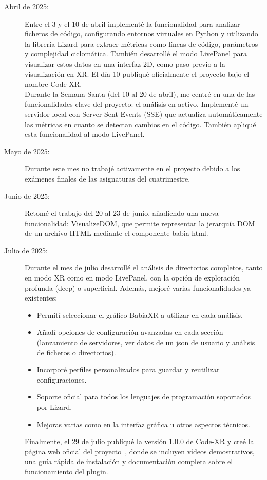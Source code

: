 \documentclass[a4paper, 12pt]{book}
\begin{document}
\begin{description}
        
    \item[Abril de 2025:] Entre el 3 y el 10 de abril implementé la funcionalidad para analizar ficheros de código, configurando entornos virtuales en Python y utilizando la librería Lizard para extraer métricas como líneas de código, parámetros y complejidad ciclomática. También desarrollé el modo LivePanel para visualizar estos datos en una interfaz 2D, como paso previo a la visualización en XR. El día 10 publiqué oficialmente el proyecto bajo el nombre Code-XR.\\
    Durante la Semana Santa (del 10 al 20 de abril), me centré en una de las funcionalidades clave del proyecto: el análisis en activo. Implementé un servidor local con Server-Sent Events (SSE) que actualiza automáticamente las métricas en cuanto se detectan cambios en el código. También apliqué esta funcionalidad al modo LivePanel.

    \item[Mayo de 2025:] Durante este mes no trabajé activamente en el proyecto debido a los exámenes finales de las asignaturas del cuatrimestre.

    \item[Junio de 2025:] Retomé el trabajo del 20 al 23 de junio, añadiendo una nueva funcionalidad: VisualizeDOM, que permite representar la jerarquía DOM de un archivo HTML mediante el componente babia-html.

    \item[Julio de 2025:] Durante el mes de julio desarrollé el análisis de directorios completos, tanto en modo XR como en modo LivePanel, con la opción de exploración profunda (deep) o superficial. Además, mejoré varias funcionalidades ya existentes:
    \begin{itemize}
        \item Permití seleccionar el gráfico BabiaXR a utilizar en cada análisis.
        \item Añadí opciones de configuración avanzadas en cada sección (lanzamiento de servidores, ver datos de un json de usuario y análisis de ficheros o directorios).
        \item Incorporé perfiles personalizados para guardar y reutilizar configuraciones.
        \item Soporte oficial para todos los lenguajes de programación soportados por Lizard.
        \item Mejoras varias como en la interfaz gráfica u otros aspectos técnicos.
    \end{itemize}
    Finalmente, el 29 de julio publiqué la versión 1.0.0 de Code-XR y creé la página web oficial del proyecto~\cite{montes2025web}, donde se incluyen vídeos demostrativos, una guía rápida de instalación y documentación completa sobre el funcionamiento del plugin.
\end{description}
\end{document}
